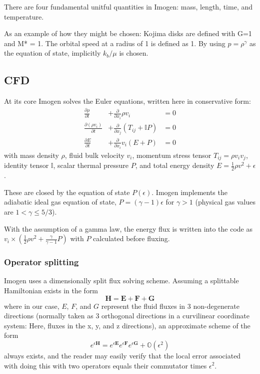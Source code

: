 \documentclass[letterpaper,12pt]{article}
\begin{document}
There are four fundamental unitful quantities in Imogen: mass, length, time, and temperature.

As an example of how they might be chosen: Kojima disks are defined with G=1 and M* = 1. The
orbital speed at a radius of 1 is defined as 1. By using $p = \rho^\gamma$ as the equation
of state, implicitly $k_b/\mu$ is chosen.



\subsection{CFD}

At its core Imogen solves the Euler equations, written here in conservative form:
\begin{align*}
\frac{\partial \rho}{\partial t} &+ \frac{\partial}{\partial x_i} \rho v_i &= 0 \\
\frac{\partial (\rho v_i)}{\partial t} &+ \frac{\partial}{\partial x_j} (T_{ij} + \mathbb{I} P) &= 0 \\
\frac{\partial E}{\partial t} &+ \frac{\partial}{\partial x_i} v_i (E + P) &= 0
\end{align*}
with mass density $\rho$, fluid bulk velocity $v_i$, momentum stress tensor
$T_{ij} = \rho v_i v_j$, identity tensor $\mathbb{I}$, scalar thermal pressure $P$,
and total energy density $E = \frac{1}{2} \rho v^2 + \epsilon$.

These are closed by the equation of state $P(\epsilon)$. Imogen implements the
adiabatic ideal gas equation of state, $P = (\gamma-1)\epsilon$ for $\gamma > 1$
(physical gas values are $1 < \gamma \le 5/3$).

With the assumption of a gamma law, the energy flux is written into the
code as $v_i \times (\frac{1}{2} \rho v^2 + \frac{\gamma}{\gamma-1}P)$ with $P$ calculated
before fluxing.

\subsubsection{Operator splitting}

Imogen uses a dimensionally split flux solving scheme. Assuming a splittable Hamiltonian
exists in the form
\[\mathbf{H} = \mathbf{E} + \mathbf{F} + \mathbf{G}\]
where in our case, $E$, $F$, and $G$ represent the fluid fluxes in 3 non-degenerate
directions (normally taken as 3 orthogonal directions in a curvilinear coordinate
system: Here, fluxes in the x, y, and z directions), an approximate scheme of the form
\[e^{\epsilon \mathbf{H}} = e^{\epsilon \mathbf{E}} e^{\epsilon \mathbf{F}}
e^{\epsilon \mathbf{G}} + \mathbb{O}(\epsilon^2) \]
always exists, and the reader may easily verify that the local error associated with
doing this with two operators equals their commutator times $\epsilon^2$.
\end{document}
